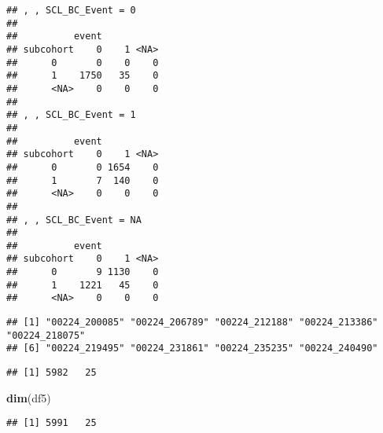 \documentclass[
]{article}
\newenvironment{Shaded}{\begin{snugshade}}{\end{snugshade}}
\newcommand{\DecValTok}[1]{\textcolor[rgb]{0.00,0.00,0.81}{#1}}
\newcommand{\KeywordTok}[1]{\textcolor[rgb]{0.13,0.29,0.53}{\textbf{#1}}}
\newcommand{\NormalTok}[1]{#1}
\newcommand{\OperatorTok}[1]{\textcolor[rgb]{0.81,0.36,0.00}{\textbf{#1}}}
\newcommand{\StringTok}[1]{\textcolor[rgb]{0.31,0.60,0.02}{#1}}
\begin{document}
\begin{verbatim}
## , , SCL_BC_Event = 0
## 
##          event
## subcohort    0    1 <NA>
##      0       0    0    0
##      1    1750   35    0
##      <NA>    0    0    0
## 
## , , SCL_BC_Event = 1
## 
##          event
## subcohort    0    1 <NA>
##      0       0 1654    0
##      1       7  140    0
##      <NA>    0    0    0
## 
## , , SCL_BC_Event = NA
## 
##          event
## subcohort    0    1 <NA>
##      0       9 1130    0
##      1    1221   45    0
##      <NA>    0    0    0
\end{verbatim}

\begin{Shaded}
\end{Shaded}

\begin{verbatim}
## [1] "00224_200085" "00224_206789" "00224_212188" "00224_213386" "00224_218075"
## [6] "00224_219495" "00224_231861" "00224_235235" "00224_240490"
\end{verbatim}

\begin{Shaded}
\end{Shaded}

\begin{verbatim}
## [1] 5982   25
\end{verbatim}

\begin{Shaded}
\begin{Highlighting}[]
\KeywordTok{dim}\NormalTok{(df5)}
\end{Highlighting}
\end{Shaded}

\begin{verbatim}
## [1] 5991   25
\end{verbatim}
\end{document}
